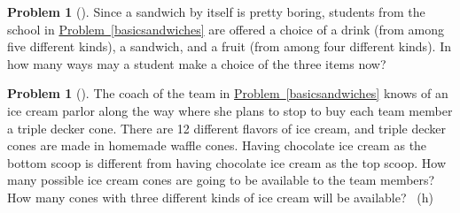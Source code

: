\documentclass[10pt,]{book}
\theoremstyle{plain}
\theoremstyle{definition}
\newtheorem{activity}[project]{Problem}
\theoremstyle{definition}
\numberwithin{equation}{chapter}
\begin{document}
\begin{activity}[] \label{completelunch}
\hypertarget{p-45}{}%
Since a sandwich by itself is pretty boring, students from the school in \hyperref[basicsandwiches]{Problem~\ref{basicsandwiches}} are offered a choice of a drink (from among five different kinds), a sandwich, and a fruit (from among four different kinds). In how many ways may a student make a choice of the three items now?%
\end{activity}
\begin{activity}[] \label{tripledeckercone}
\hypertarget{p-47}{}%
The coach of the team in \hyperref[basicsandwiches]{Problem~\ref{basicsandwiches}} knows of an ice cream parlor along the way where she plans to stop to buy each team member a triple decker cone. There are 12 different flavors of ice cream, and triple decker cones are made in homemade waffle cones. Having chocolate ice cream as the bottom scoop is different from having chocolate ice cream as the top scoop. How many possible ice cream cones are going to be available to the team members? How many cones with three different kinds of ice cream will be available?%
~{\tiny (h)}\end{activity}
\end{document}
